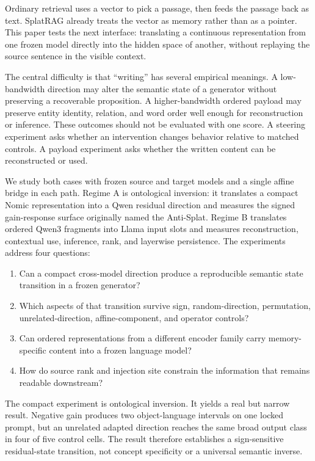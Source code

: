 \documentclass[11pt]{article}
\begin{document}
Ordinary retrieval uses a vector to pick a passage, then feeds the passage back
as text. SplatRAG already treats the vector as memory rather than as a pointer.
This paper tests the next interface: translating a continuous representation
from one frozen model directly into the hidden space of another, without
replaying the source sentence in the visible context.

The central difficulty is that ``writing'' has several empirical meanings. A
low-bandwidth direction may alter the semantic state of a generator without
preserving a recoverable proposition. A higher-bandwidth ordered payload may
preserve entity identity, relation, and word order well enough for
reconstruction or inference. These outcomes should not be evaluated with one
score. A steering experiment asks whether an intervention changes behavior
relative to matched controls. A payload experiment asks whether the written
content can be reconstructed or used.

We study both cases with frozen source and target models and a single affine
bridge in each path. Regime A is ontological inversion: it translates a compact
Nomic representation into a Qwen residual direction and measures the signed
gain-response surface originally named the Anti-Splat. Regime B translates
ordered Qwen3 fragments into Llama input slots and measures reconstruction,
contextual use, inference, rank, and layerwise persistence. The experiments
address four questions:

\begin{enumerate}
\item Can a compact cross-model direction produce a reproducible semantic state transition in a frozen generator?
\item Which aspects of that transition survive sign, random-direction, permutation, unrelated-direction, affine-component, and operator controls?
\item Can ordered representations from a different encoder family carry memory-specific content into a frozen language model?
\item How do source rank and injection site constrain the information that remains readable downstream?
\end{enumerate}


The compact experiment is ontological inversion. It yields a real but narrow
result. Negative gain produces two object-language intervals on one locked
prompt, but an unrelated adapted direction reaches the same broad output class
in four of five control cells. The result therefore establishes a
sign-sensitive residual-state transition, not concept specificity or a
universal semantic inverse.
\end{document}
